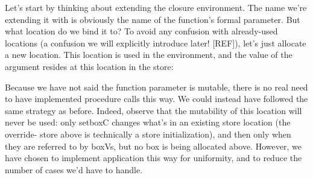 Let’s start by thinking about extending the closure environment. The name we’re
extending it with is obviously the name of the function’s formal parameter. But
what location do we bind it to? To avoid any confusion with already-used
locations (a confusion we will explicitly introduce later! [REF]), let’s just
allocate a new location. This location is used in the environment, and the value
of the argument resides at this location in the store:

Because we have not said the function parameter is mutable, there is no real
need to have implemented procedure calls this way. We could instead have
followed the same strategy as before. Indeed, observe that the mutability of
this location will never be used: only setboxC changes what’s in an existing
store location (the override- store above is technically a store
initialization), and then only when they are referred to by boxVs, but no box is being allocated above. However, we have chosen to implement application this way
for uniformity, and to reduce the number of cases we’d have to handle.

